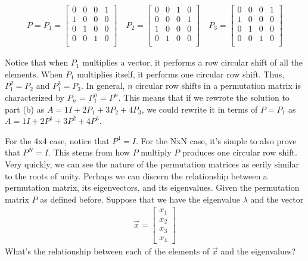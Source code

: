 \begin{enumerate}
{\begin{align*}
P = P_{1} =
\begin{bmatrix}
0 & 0 & 0 & 1\\
1 & 0 & 0 & 0\\
0 & 1 & 0 & 0\\
0 & 0 & 1 & 0\\
\end{bmatrix}
\hspace{1em}
P_{2} =
\begin{bmatrix}
0 & 0 & 1 & 0 \\
0 & 0 & 0 & 1 \\
1 & 0 & 0 & 0 \\
0 & 1 & 0 & 0 \\
\end{bmatrix}
\hspace{1em}
P_{3} =
\begin{bmatrix}
0 & 0 & 0 & 1 \\
1 & 0 & 0 & 0 \\
0 & 1 & 0 & 0 \\
0 & 0 & 1 & 0 \\
\end{bmatrix}
\end{align*}

Notice that when $P_{1}$ multiplies a vector, it performs a row circular shift of all the elements.
When $P_{1}$ multiplies itself, it performs one circular row shift.
Thus, $P_{1}^{2} = P_{2}$ and $P_{1}^{3} = P_{3}$.
In general, $n$ circular row shifts in a permutation matrix is characterized by $P_{n}$ = $P_{1}^{n} = P^{n}$.
This means that if we rewrote the solution to part (b) as $A = 1I + 2P_{1} + 3P_{2} + 4P_{3}$, we could rewrite it in terms of $P = P_{1}$ as $A = 1I + 2P^{1} + 3P^{2} + 4P^{3}$.
}

\qitem
For the 4x4 case, notice that $P^{4} = I$.
For the NxN case, it's simple to also prove that $P^{N} = I$.
This stems from how $P$ multiply $P$ produces one circular row shift.
Very quickly, we can see the nature of the permutation matrices as eerily similar to the roots of unity.
Perhaps we can discern the relationship between a permutation matrix, its eigenvectors, and its eigenvalues.
Given the permutation matrix $P$ as defined before.
Suppose that we have the eigenvalue $\lambda$ and the vector
\begin{align*}
\vec{x} =
\begin{bmatrix}
x_{1}\\
x_{2}\\
x_{3}\\
x_{4}
\end{bmatrix}
\end{align*}
What's the relationship between each of the elements of $\vec{x}$ and the eigenvalues?



\end{enumerate}
